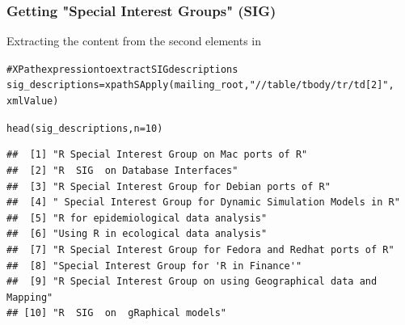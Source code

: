 \documentclass{beamer}\usepackage[]{graphicx}\usepackage[]{color}
\makeatletter
\newcommand{\hlnum}[1]{\textcolor[rgb]{0.063,0.58,0.627}{#1}}%
\newcommand{\hlstr}[1]{\textcolor[rgb]{0.063,0.58,0.627}{#1}}%
\newcommand{\hlcom}[1]{\textcolor[rgb]{0.588,0.588,0.588}{#1}}%
\newcommand{\hlstd}[1]{\textcolor[rgb]{0.196,0.196,0.196}{#1}}%
\newcommand{\hlkwb}[1]{\textcolor[rgb]{0.627,0,0.314}{#1}}%
\newcommand{\hlkwc}[1]{\textcolor[rgb]{0,0.631,0.314}{#1}}%
\newcommand{\hlkwd}[1]{\textcolor[rgb]{0.78,0.227,0.412}{#1}}%
\newenvironment{kframe}{%
 \def\at@end@of@kframe{}%
 \ifinner\ifhmode%
  \def\at@end@of@kframe{\end{minipage}}%
  \begin{minipage}{\columnwidth}%
 \fi\fi%
 \def\FrameCommand##1{\hskip\@totalleftmargin \hskip-\fboxsep
 \colorbox{shadecolor}{##1}\hskip-\fboxsep
     \hskip-\linewidth \hskip-\@totalleftmargin \hskip\columnwidth}%
 \MakeFramed {\advance\hsize-\width
   \@totalleftmargin\z@ \linewidth\hsize
   \@setminipage}}%
 {\par\unskip\endMakeFramed%
 \at@end@of@kframe}
\newenvironment{knitrout}{}{} %
\makeatother
\begin{document}
\begin{frame}[fragile]
\frametitle{Getting "Special Interest Groups" (SIG)}

Extracting the content from the second  elements in  
\begin{knitrout}\tiny
{}\color{fgcolor}\begin{kframe}
\begin{alltt}
\hlcom{# XPath expression to extract SIG descriptions}
\hlstd{sig_descriptions} \hlkwb{=} \hlkwd{xpathSApply}\hlstd{(mailing_root,} \hlstr{"//table/tbody/tr/td[2]"}\hlstd{,}
                               \hlstd{xmlValue)}

\hlkwd{head}\hlstd{(sig_descriptions,} \hlkwc{n} \hlstd{=} \hlnum{10}\hlstd{)}
\end{alltt}
\begin{verbatim}
##  [1] "R Special Interest Group on Mac ports of R"                     
##  [2] "R  SIG  on Database Interfaces"                                 
##  [3] "R Special Interest Group for Debian ports of R"                 
##  [4] " Special Interest Group for Dynamic Simulation Models in R"     
##  [5] "R for epidemiological data analysis"                            
##  [6] "Using R in ecological data analysis"                            
##  [7] "R Special Interest Group for Fedora and Redhat ports of R"      
##  [8] "Special Interest Group for 'R in Finance'"                      
##  [9] "R Special Interest Group on using Geographical data and Mapping"
## [10] "R  SIG  on  gRaphical models"
\end{verbatim}
\end{kframe}
\end{knitrout}

\end{frame}

\end{document}
